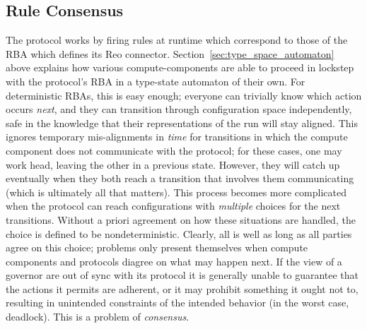 \subsection{Rule Consensus}
\label{sec:rule_consensus}
The protocol works by firing rules at runtime which correspond to those of the RBA which defines its Reo connector. Section~\ref{sec:type_space_automaton} above explains how various compute-components are able to proceed in lockstep with the protocol's RBA in a type-state automaton of their own. For deterministic RBAs, this is easy enough; everyone can trivially know which action occurs \textit{next}, and they can transition through configuration space independently, safe in the knowledge that their representations of the run will stay aligned. This ignores temporary mis-alignments in \textit{time} for transitions in which the compute component does not communicate with the protocol; for these cases, one may work head, leaving the other in a previous state. However, they will catch up eventually when they both reach a transition that involves them communicating (which is ultimately all that matters). This process becomes more complicated when the protocol can reach configurations with \textit{multiple} choices for the next transitions. Without a priori agreement on how these situations are handled, the choice is defined to be nondeterministic. Clearly, all is well as long as all parties agree on this choice; problems only present themselves when compute components and protocols diagree on what may happen next. If the view of a governor are out of sync with its protocol it is generally unable to guarantee that the actions it permits are adherent, or it may prohibit something it ought not to, resulting in unintended constraints of the intended behavior (in the worst case, deadlock). This is a problem of \textit{consensus}. 

  


